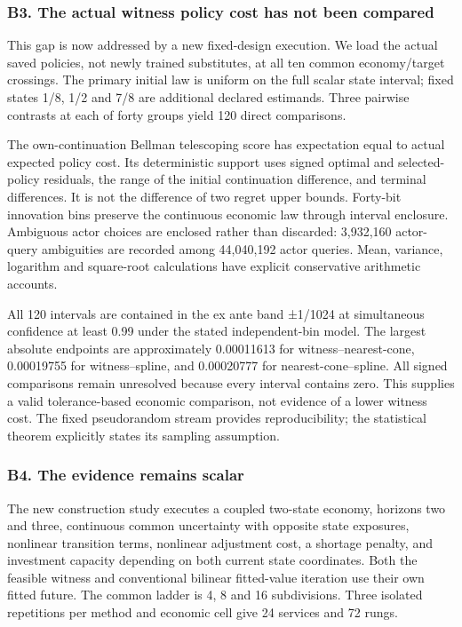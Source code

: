 \documentclass[ecta,nameyear,draft]{econsocart}
\begin{document}
\hypertarget{b3-the-actual-witness-policy-cost-has-not-been-compared}{%
\subsubsection{B3. The actual witness policy cost has not been
compared}\label{b3-the-actual-witness-policy-cost-has-not-been-compared}}

This gap is now addressed by a new fixed-design execution. We load the
actual saved policies, not newly trained substitutes, at all ten common
economy/target crossings. The primary initial law is uniform on the full
scalar state interval; fixed states 1/8, 1/2 and 7/8 are additional
declared estimands. Three pairwise contrasts at each of forty groups
yield 120 direct comparisons.

The own-continuation Bellman telescoping score has expectation equal to
actual expected policy cost. Its deterministic support uses signed
optimal and selected-policy residuals, the range of the initial
continuation difference, and terminal differences. It is not the
difference of two regret upper bounds. Forty-bit innovation bins
preserve the continuous economic law through interval enclosure.
Ambiguous actor choices are enclosed rather than discarded: 3,932,160
actor-query ambiguities are recorded among 44,040,192 actor queries.
Mean, variance, logarithm and square-root calculations have explicit
conservative arithmetic accounts.

All 120 intervals are contained in the ex ante band ±1/1024 at
simultaneous confidence at least 0.99 under the stated independent-bin
model. The largest absolute endpoints are approximately 0.00011613 for
witness--nearest-cone, 0.00019755 for witness--spline, and 0.00020777
for nearest-cone--spline. All signed comparisons remain unresolved
because every interval contains zero. This supplies a valid
tolerance-based economic comparison, not evidence of a lower witness
cost. The fixed pseudorandom stream provides reproducibility; the
statistical theorem explicitly states its sampling assumption.

\hypertarget{b4-the-evidence-remains-scalar}{%
\subsubsection{B4. The evidence remains
scalar}\label{b4-the-evidence-remains-scalar}}

The new construction study executes a coupled two-state economy,
horizons two and three, continuous common uncertainty with opposite
state exposures, nonlinear transition terms, nonlinear adjustment cost,
a shortage penalty, and investment capacity depending on both current
state coordinates. Both the feasible witness and conventional bilinear
fitted-value iteration use their own fitted future. The common ladder is
4, 8 and 16 subdivisions. Three isolated repetitions per method and
economic cell give 24 services and 72 rungs.
\end{document}

